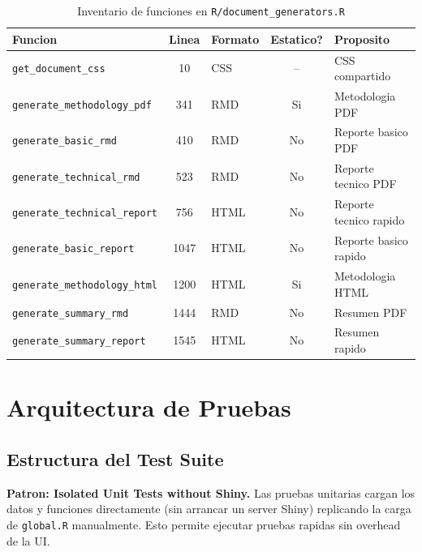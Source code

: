 \documentclass[11pt, letterpaper, twoside]{report}
\begin{document}
\begin{table}[h]
\centering
\caption{Inventario de funciones en \texttt{R/document\_generators.R}}
\label{tab:docgen_functions}
\begin{tabularx}{\textwidth}{lclcX}
\toprule
\textbf{Funcion} & \textbf{Linea} & \textbf{Formato} & \textbf{Estatico?} & \textbf{Proposito} \\
\midrule
\texttt{get\_document\_css} & 10 & CSS & -- & CSS compartido \\
\texttt{generate\_methodology\_pdf} & 341 & RMD & Si & Metodologia PDF \\
\texttt{generate\_basic\_rmd} & 410 & RMD & No & Reporte basico PDF \\
\texttt{generate\_technical\_rmd} & 523 & RMD & No & Reporte tecnico PDF \\
\texttt{generate\_technical\_report} & 756 & HTML & No & Reporte tecnico rapido \\
\texttt{generate\_basic\_report} & 1047 & HTML & No & Reporte basico rapido \\
\texttt{generate\_methodology\_html} & 1200 & HTML & Si & Metodologia HTML \\
\texttt{generate\_summary\_rmd} & 1444 & RMD & No & Resumen PDF \\
\texttt{generate\_summary\_report} & 1545 & HTML & No & Resumen rapido \\
\bottomrule
\end{tabularx}
\end{table}


\chapter{Arquitectura de Pruebas}
\label{ch:tests}

\section{Estructura del Test Suite}

\begin{patronbox}
\textbf{Patron: Isolated Unit Tests without Shiny.} Las pruebas unitarias cargan
los datos y funciones directamente (sin arrancar un server Shiny) replicando la
carga de \texttt{global.R} manualmente. Esto permite ejecutar pruebas rapidas
sin overhead de la UI.
\end{patronbox}
\end{document}
